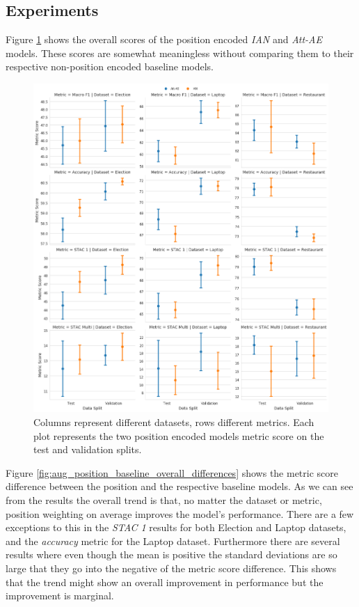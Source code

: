 \subsection{Experiments}

Figure \ref{fig:aug_overall_position_scores} shows the overall scores of the position encoded \textit{IAN} and \textit{Att-AE} models. These scores are somewhat meaningless without comparing them to their respective non-position encoded baseline models.

\begin{figure}[h!]
    \centering
    \includegraphics[scale=0.32]{images/augmentation/methods_performance/Position_Encoding/overall_position_scores.png}
    \caption{Columns represent different datasets, rows different metrics. Each plot represents the two position encoded models metric score on the test and validation splits.}
    \label{fig:aug_overall_position_scores}
\end{figure}

Figure \ref{fig:aug_position_baseline_overall_differences} shows the metric score difference between the position and the respective baseline models. As we can see from the results the overall trend is that, no matter the dataset or metric, position weighting on average improves the model's performance. There are a few exceptions to this in the \textit{STAC 1} results for both Election and Laptop datasets, and the \textit{accuracy} metric for the Laptop dataset. Furthermore there are several results where even though the mean is positive the standard deviations are so large that they go into the negative of the metric score difference. This shows that the trend might show an overall improvement in performance but the improvement is marginal.

